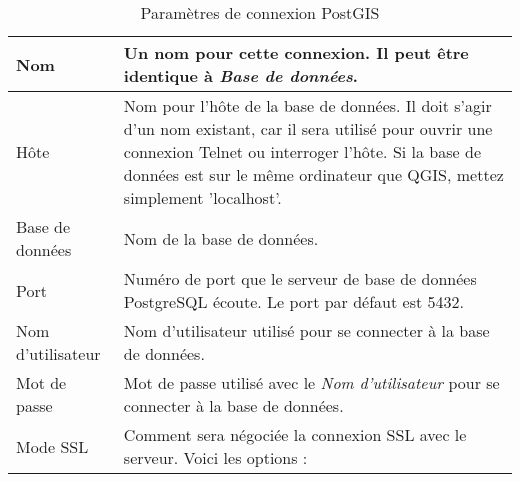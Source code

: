 \begin{table}[ht]
\centering
\caption{Paramètres de connexion PostGIS}\label{tab:postgis_connection_parms}\medskip
\begin{tabular}{|l|p{5in}|}
\hline Nom & Un nom pour cette connexion. Il peut être identique à \textsl{Base de données}.\\
\hline Hôte \index{PostgreSQL!host} & Nom pour l'hôte de la base de données. Il doit s'agir d'un nom existant, car il sera utilisé pour ouvrir une connexion Telnet ou interroger l'hôte. Si la base de données est sur le même ordinateur que QGIS, mettez simplement 'localhost'. \\
\hline Base de données \index{PostgreSQL!database} & Nom de la base de données.\\
\hline Port \index{PostgreSQL!port}& Numéro de port que le serveur de base de données PostgreSQL écoute. Le port par défaut est 5432.\\
\hline Nom d'utilisateur \index{PostgreSQL!username} & Nom d'utilisateur utilisé pour se connecter à la base de données.\\
\hline Mot de passe \index{PostgreSQL!password} & Mot de passe utilisé avec le \textsl{Nom d'utilisateur} pour se connecter à la base de données.\\
\hline Mode SSL \index{PostgreSQL!sslmode} & Comment sera négociée la connexion SSL avec le serveur. Voici les options :

\end{tabular}
\end{table}
